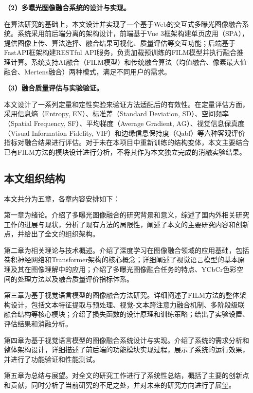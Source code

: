 \textbf{（2）多曝光图像融合系统的设计与实现。}

在算法研究的基础上，本文设计并实现了一个基于Web的交互式多曝光图像融合系统。系统采用前后端分离的架构设计，前端基于Vue 3框架构建单页应用（SPA），提供图像上传、算法选择、融合结果可视化、质量评估等交互功能；后端基于FastAPI框架构建RESTful API服务，负责加载预训练的FILM模型并执行融合推理计算。系统支持AI融合（FILM模型）和传统融合算法（均值融合、像素最大值融合、Mertens融合）两种模式，满足不同用户的需求。

\textbf{（3）融合质量评估与实验验证。}

本文设计了一系列定量和定性实验来验证方法适配后的有效性。在定量评估方面，采用信息熵（Entropy, EN）、标准差（Standard Deviation, SD）、空间频率（Spatial Frequency, SF）、平均梯度（Average Gradient, AG）、视觉信息保真度（Visual Information Fidelity, VIF）和边缘信息保持度（Qabf）等六种客观评价指标对融合结果进行评估。对于未在本项目中重新训练的结构变体，本文主要结合已有FILM方法的模块设计进行分析，不将其作为本文独立完成的消融实验结果。

\subsection{本文组织结构}\label{sec:organization}

本文共分为五章，各章内容安排如下：

第一章为绪论。介绍了多曝光图像融合的研究背景和意义，综述了国内外相关研究工作的进展与现状，分析了现有方法的局限性，阐述了本文的主要研究内容和创新点，并给出了全文的组织架构。

第二章为相关理论与技术概述。介绍了深度学习在图像融合领域的应用基础，包括卷积神经网络和Transformer架构的核心概念；详细阐述了视觉语言模型的基本原理及其在图像理解中的应用；介绍了多曝光图像融合任务的特点、YCbCr色彩空间的处理方法以及融合质量评价指标体系。

第三章为基于视觉语言模型的图像融合方法研究。详细阐述了FILM方法的整体架构设计，包括文本特征提取与预处理、视觉-文本跨注意力融合机制、多阶段级联融合结构等核心模块；介绍了损失函数的设计原理和训练策略；给出了实验设置、评估结果和消融分析。

第四章为基于视觉语言模型的图像融合系统设计与实现。介绍了系统的需求分析和整体架构设计，详细描述了前后端的功能模块实现过程，展示了系统的运行效果，并进行了功能验证和性能测试。

第五章为总结与展望。对全文的研究工作进行了系统性总结，概括了主要的创新点和贡献，同时分析了当前研究的不足之处，并对未来的研究方向进行了展望。
